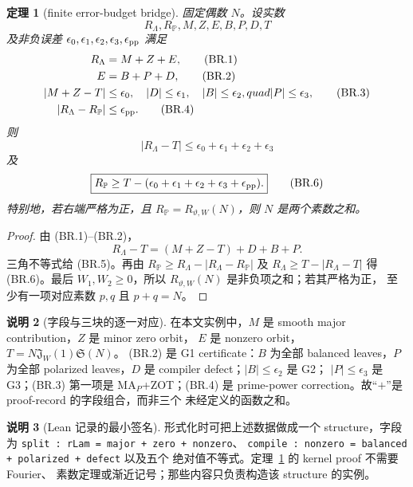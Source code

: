 \documentclass[11pt,a4paper]{ctexart}
\newtheorem{theorem}{定理}[section]
\theoremstyle{definition}
\newtheorem{remark}[theorem]{说明}
\newcommand{\1}{\mathbf 1}
\begin{document}
\begin{theorem}[finite error-budget bridge]\label{thm:finite-bridge}
固定偶数 $N$。设实数
\[
R_\Lambda,R_{\mathbb P},M,Z,E,B,P,D,T
\]
及非负误差 $\epsilon_0,\epsilon_1,\epsilon_2,\epsilon_3,\epsilon_{\rm pp}$
满足
\begin{align}
R_\Lambda&=M+Z+E,                                      \tag{BR.1}\\
E&=B+P+D,                                               \tag{BR.2}\\
|M+Z-T|&\le\epsilon_0,\quad |D|\le\epsilon_1,
\quad |B|\le\epsilon_2,quad |P|\le\epsilon_3,       \tag{BR.3}\\
|R_\Lambda-R_{\mathbb P}|&\le\epsilon_{\rm pp}.      \tag{BR.4}
\end{align}
则
\[
\boxed{|R_\Lambda-T|\le
\epsilon_0+\epsilon_1+\epsilon_2+\epsilon_3}          \tag{BR.5}
\]
及
\[
\boxed{R_{\mathbb P}\ge
T-(\epsilon_0+\epsilon_1+\epsilon_2+\epsilon_3
+\epsilon_{\rm pp}).}                                 \tag{BR.6}
\]
特别地，若右端严格为正，且 $R_{\mathbb P}=R_{\vartheta,W}(N)$，则
$N$ 是两个素数之和。
\end{theorem}

\begin{proof}
由 (BR.1)--(BR.2)，
\[
R_\Lambda-T=(M+Z-T)+D+B+P.
\]
三角不等式给 (BR.5)。再由
$R_{\mathbb P}\ge R_\Lambda-|R_\Lambda-R_{\mathbb P}|$
及 $R_\Lambda\ge T-|R_\Lambda-T|$ 得 (BR.6)。最后
$W_1,W_2\ge0$，所以 $R_{\vartheta,W}(N)$ 是非负项之和；若其严格为正，
至少有一项对应素数 $p,q$ 且 $p+q=N$。
\end{proof}

\begin{remark}[字段与三块的逐一对应]
在本文实例中，$M$ 是 smooth major contribution，$Z$ 是 minor zero orbit，
$E$ 是 nonzero orbit，$T=N\mathfrak J_W(1)\mathfrak S(N)$。
(BR.2) 是 G1 certificate：$B$ 为全部 balanced leaves，$P$ 为全部 polarized
leaves，$D$ 是 compiler defect；$|B|\le\epsilon_2$ 是 G2；
$|P|\le\epsilon_3$ 是 G3；(BR.3) 第一项是 MA$_P$+ZOT；(BR.4) 是
prime-power correction。故“$+$”是 proof-record 的字段组合，而非三个
未经定义的函数之和。
\end{remark}

\begin{remark}[Lean 记录的最小签名]
形式化时可把上述数据做成一个 structure，字段为
\texttt{split : rLam = major + zero + nonzero}、
\texttt{compile : nonzero = balanced + polarized + defect} 以及五个
绝对值不等式。定理~\ref{thm:finite-bridge} 的 kernel proof 不需要 Fourier、
素数定理或渐近记号；那些内容只负责构造该 structure 的实例。
\end{remark}
\end{document}

